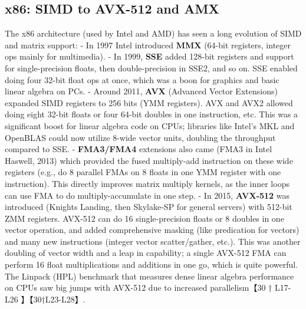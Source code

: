 \subsection{x86: SIMD to AVX-512 and AMX}  
The x86 architecture (used by Intel and AMD) has seen a long evolution of SIMD and matrix support:
- In 1997 Intel introduced \textbf{MMX} (64-bit registers, integer ops mainly for multimedia).
- In 1999, \textbf{SSE} added 128-bit registers and support for single-precision floats, then double-precision in SSE2, and so on. SSE enabled doing four 32-bit float ops at once, which was a boon for graphics and basic linear algebra on PCs.
- Around 2011, \textbf{AVX} (Advanced Vector Extensions) expanded SIMD registers to 256 bits (YMM registers). AVX and AVX2 allowed doing eight 32-bit floats or four 64-bit doubles in one instruction, etc. This was a significant boost for linear algebra code on CPUs; libraries like Intel’s MKL and OpenBLAS could now utilize 8-wide vector units, doubling the throughput compared to SSE.
- \textbf{FMA3/FMA4} extensions also came (FMA3 in Intel Haswell, 2013) which provided the fused multiply-add instruction on these wide registers (e.g., do 8 parallel FMAs on 8 floats in one YMM register with one instruction). This directly improves matrix multiply kernels, as the inner loops can use FMA to do multiply-accumulate in one step.
- In 2015, \textbf{AVX-512} was introduced (Knights Landing, then Skylake-SP for general servers) with 512-bit ZMM registers. AVX-512 can do 16 single-precision floats or 8 doubles in one vector operation, and added comprehensive masking (like predication for vectors) and many new instructions (integer vector scatter/gather, etc.). This was another doubling of vector width and a leap in capability; a single AVX-512 FMA can perform 16 float multiplications and additions in one go, which is quite powerful. The Linpack (HPL) benchmark that measures dense linear algebra performance on CPUs saw big jumps with AVX-512 due to increased parallelism【30 † L17-L26 】【30†L23-L28】.

